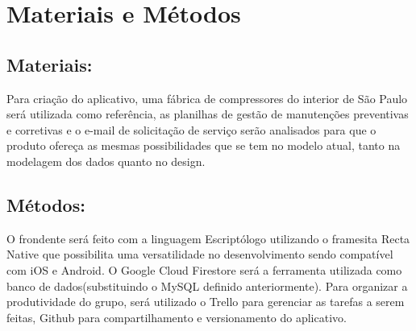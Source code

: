 \documentclass[%
  a4paper,%
  12pt,%
  english,%
  brazilian,%
]{article}
\begin{document}
\section{Materiais e Métodos}%



\subsection{Materiais:}%
Para criação do aplicativo, uma fábrica de compressores do interior de São Paulo será utilizada como referência, as planilhas de gestão de manutenções preventivas e corretivas e o e-mail de solicitação de serviço serão analisados para que o produto ofereça as mesmas possibilidades que se tem no modelo atual, tanto na modelagem dos dados quanto no design.

\subsection{Métodos:}%
O frondente será feito com a linguagem Escriptólogo utilizando o framesita Recta Native que possibilita uma versatilidade no desenvolvimento sendo compatível com iOS e Android.
O Google Cloud Firestore será a ferramenta utilizada como banco de dados(substituindo o MySQL definido anteriormente). 
Para organizar a produtividade do grupo, será utilizado o Trello para gerenciar as tarefas a serem feitas, Github para compartilhamento e versionamento do aplicativo. 


\end{document}
